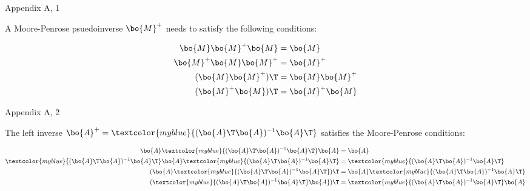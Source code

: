 \documentclass{beamer}
\begin{document}
\begin{frame}{Appendix A, 1}
	\begin{flushleft}
		
		A Moore-Penrose psuedoinverse $\bo{M}^+$ needs to satisfy the following conditions:
		
		\begin{align}
			\bo{M}\bo{M}^+\bo{M} &= \bo{M} \\
			\bo{M}^+\bo{M} \bo{M}^+ &= \bo{M}^+ \\
			(\bo{M}\bo{M}^+)\T &= \bo{M}\bo{M}^+ \\
			(\bo{M}^+\bo{M})\T &= \bo{M}^+\bo{M}
		\end{align}
		
	\end{flushleft}
\end{frame}



\begin{frame}{Appendix A, 2}
	\begin{flushleft}
		
		The left inverse $\bo{A}^+ =\textcolor{myblue}{ (\bo{A}\T \bo{A})^{-1} \bo{A}\T}$ satisfies the Moore-Penrose conditions:
		
		\begin{align}
			\bo{A}\textcolor{myblue}{(\bo{A}\T \bo{A})^{-1} \bo{A}\T}\bo{A} &= \bo{A} 
			\\
			\textcolor{myblue}{(\bo{A}\T \bo{A})^{-1} \bo{A}\T} \bo{A} \textcolor{myblue}{(\bo{A}\T \bo{A})^{-1} \bo{A}\T} &= \textcolor{myblue}{(\bo{A}\T \bo{A})^{-1} \bo{A}\T} \\
			(\bo{A} \textcolor{myblue}{(\bo{A}\T \bo{A})^{-1} \bo{A}\T})\T &= \bo{A} \textcolor{myblue}{(\bo{A}\T \bo{A})^{-1} \bo{A}\T} \\
			( \textcolor{myblue}{(\bo{A}\T \bo{A})^{-1} \bo{A}\T}\bo{A})\T &= \textcolor{myblue}{(\bo{A}\T \bo{A})^{-1} \bo{A}\T} \bo{A}
		\end{align}
		
	\end{flushleft}
\end{frame}
\end{document}
